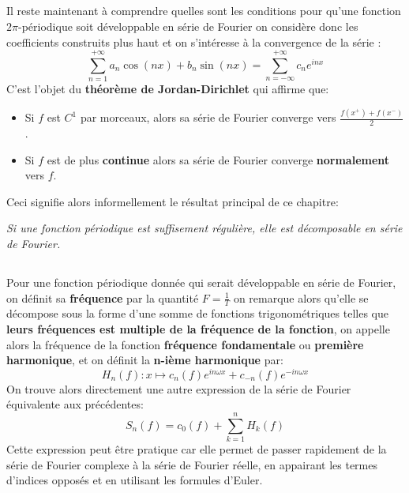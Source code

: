 \subsection*{}
Il reste maintenant à comprendre quelles sont les conditions pour qu'une fonction \(2\pi\)-périodique soit développable en série de Fourier on considère donc les coefficients construits plus haut et on s'intéresse à la convergence de la série :
\[
   \sum_{n = 1}^{+\infty} a_n\cos(nx) + b_n\sin(nx) = \sum_{n = -\infty}^{+\infty} c_ne^{inx}   
\]
C'est l'objet du \textbf{théorème de Jordan-Dirichlet} qui affirme que:
\begin{itemize}
   \item Si \(f\) est \(C^1\) par morceaux, alors sa série de Fourier converge vers \(\frac{f(x^+) + f(x^-)}{2}\).
   \item Si \(f\) est de plus \textbf{continue} alors sa série de Fourier converge \textbf{normalement} vers \(f\).
\end{itemize}
Ceci signifie alors informellement le résultat principal de ce chapitre:
\begin{center}
   \textit{Si une fonction périodique est suffisement régulière, elle est décomposable en série de Fourier.}
\end{center}

\subsection*{}
Pour une fonction périodique donnée qui serait développable en série de Fourier, on définit sa \textbf{fréquence} par la quantité \(F = \frac{1}{T}\) on remarque alors qu'elle se décompose sous la forme d'une somme de fonctions trigonométriques telles que \textbf{leurs fréquences est multiple de la fréquence de la fonction}, on appelle alors la fréquence de la fonction \textbf{fréquence fondamentale} ou \textbf{première harmonique}, et on définit la \textbf{n-ième harmonique} par:
\[
   H_n(f) : x \longmapsto c_n(f)e^{in\omega x} + c_{-n}(f)e^{-in\omega x}  
\]
On trouve alors directement une autre expression de la série de Fourier équivalente aux précédentes:
\[
   S_n(f) = c_0(f) + \sum_{k=1}^{n} H_k(f)
\] 
Cette expression peut être pratique car elle permet de passer rapidement de la série de Fourier complexe à la série de Fourier réelle, en appairant les termes d'indices opposés et en utilisant les formules d'Euler.
\pagebreak
